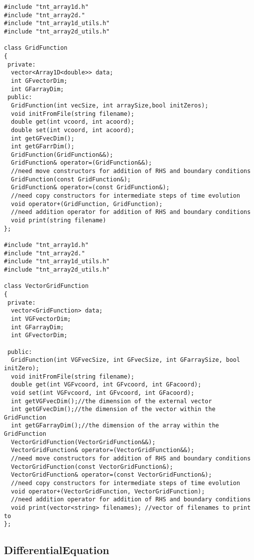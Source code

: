 \documentclass{article}
\begin{document}
\begin{verbatim}
#include "tnt_array1d.h"
#include "tnt_array2d."
#include "tnt_array1d_utils.h"
#include "tnt_array2d_utils.h"

class GridFunction
{
 private:
  vector<Array1D<double>> data;
  int GFvectorDim;
  int GFarrayDim;
 public:
  GridFunction(int vecSize, int arraySize,bool initZeros);
  void initFromFile(string filename);
  double get(int vcoord, int acoord);
  double set(int vcoord, int acoord);
  int getGFvecDim();
  int getGFarrDim();  
  GridFunction(GridFunction&&);
  GridFunction& operator=(GridFunction&&);
  //need move constructors for addition of RHS and boundary conditions
  GridFunction(const GridFunction&);
  GridFunction& operator=(const GridFunction&);
  //need copy constructors for intermediate steps of time evolution
  void operator+(GridFunction, GridFunction);
  //need addition operator for addition of RHS and boundary conditions
  void print(string filename)
};

#include "tnt_array1d.h"
#include "tnt_array2d."
#include "tnt_array1d_utils.h"
#include "tnt_array2d_utils.h"

class VectorGridFunction
{
 private:
  vector<GridFunction> data;
  int VGFvectorDim;
  int GFarrayDim;
  int GFvectorDim;

 public:
  GridFunction(int VGFvecSize, int GFvecSize, int GFarraySize, bool initZero);
  void initFromFile(string filename);
  double get(int VGFvcoord, int GFvcoord, int GFacoord);
  void set(int VGFvcoord, int GFvcoord, int GFacoord);
  int getVGFvecDim();//the dimension of the external vector
  int getGFvecDim();//the dimension of the vector within the GridFunction
  int getGFarrayDim();//the dimension of the array within the GridFunction
  VectorGridFunction(VectorGridFunction&&);
  VectorGridFunction& operator=(VectorGridFunction&&);
  //need move constructors for addition of RHS and boundary conditions
  VectorGridFunction(const VectorGridFunction&);
  VectorGridFunction& operator=(const VectorGridFunction&);
  //need copy constructors for intermediate steps of time evolution
  void operator+(VectorGridFunction, VectorGridFunction);
  //need addition operator for addition of RHS and boundary conditions
  void print(vector<string> filenames); //vector of filenames to print to
};

\end{verbatim}


\subsection{DifferentialEquation}
\end{document}

